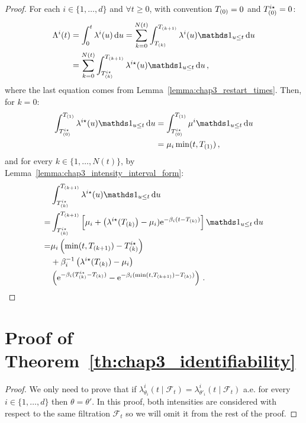 \begin{subappendices}
      \begin{proof}
        For each $i\in\{1,\ldots, d\}$ and \(\forall t\geq 0\), with convention \(T\park[0] = 0\) and \(T\park[0]^{i\star} = 0\):
        \begin{align*}
          \Lambda^i(t)
          &= \int_{0}^{t}{\lambda^i(u)\,\mathrm{d}u}
          = \sum_{k=0}^{N(t)} \int_{T\park}^{T\park[k+1]}{\lambda^i(u) \II_{u \le t} \,\mathrm{d}u}\\
          &= \sum_{k=0}^{N(t)} \int_{T\park^{i\star}}^{T\park[k+1]} \lambda^{i\star}(u) \II_{u \le t} \, \mathrm{d}u \,,
        \end{align*}
        where the last equation comes from Lemma~\ref{lemma:chap3_restart_times}.
        Then, for \(k=0\):
        \begin{align*}
          \int_{T\park[0]^{i\star}}^{T\park[1]} \lambda^{i\star}(u) \II_{u \le t} \, \mathrm{d}u
          &= \int_{T\park[0]^{i\star}}^{T\park[1]} \mu^i \II_{u \le t} \, \mathrm{d}u\\
          &= \mu_i \min(t, T\park[1]) \,,
        \end{align*}
        and for every \(k \in \{1, \dots, N(t)\}\), by Lemma~\ref{lemma:chap3_intensity_interval_form}:
        \begin{align*}
          &\int_{T\park^{i\star}}^{T\park[k+1]} \lambda^{i\star}(u) \II_{u \le t} \, \mathrm{d}u \\
          = &\int_{T\park^{i\star}}^{T\park[k+1]} \left[ \mu_i + \left(\lambda^{i\star}(T\park\right) - \mu_i)\mathrm{e}^{-\beta_i(t-T\park)} \right] \II_{u \le t} \, \mathrm{d}u \\
          = &\mu_i \left(\min(t, T\park[k+1]) - T\park^{i\star}\right)\\ &+ \beta_i^{-1} \left(\lambda^{i\star}(T\park) - \mu_i \right) \\
          &\left(\mathrm{e}^{-\beta_i(T\park^{i\star} - T\park)} - \mathrm{e}^{-\beta_i(\min(t, T\park[k+1])- T\park)} \right)\,.
        \end{align*}
      \end{proof}
  
  \section{Proof of Theorem~\ref{th:chap3_identifiability}}\label{app:chap3_proof}
  
  \begin{proof}
      We only need to prove that if $\lambda_{\theta_i}^i(t \mid \mathcal{F}_t) = \lambda_{\theta'_i}^i(t \mid \mathcal{F}_t)$ a.e. for every $i\in\{1, \ldots, d\}$ then $\theta = \theta'$. In this proof, both intensities are considered with respect to the same filtration $\mathcal{F}_t$ so we will omit it from the rest of the proof.
      

\end{proof}
\end{subappendices}
